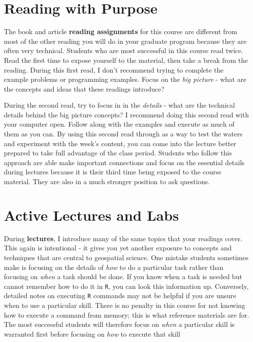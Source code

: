 \documentclass[]{book}
\theoremstyle{definition}
\theoremstyle{definition}
\theoremstyle{remark}
\begin{document}
\section{Reading with Purpose}\label{reading-with-purpose}

The book and article \textbf{reading assignments} for this course are
different from most of the other reading you will do in your graduate
program because they are often very technical. Students who are most
successful in this course read twice. Read the first time to expose
yourself to the material, then take a break from the reading. During
this first read, I don't recommend trying to complete the example
problems or programming examples. Focus on the \emph{big picture} - what
are the concepts and ideas that these readings introduce?

During the second read, try to focus in in the \emph{details} - what are
the technical details behind the big picture concepts? I recommend doing
this second read with your computer open. Follow along with the examples
and execute as much of them as you can. By using this second read
through as a way to test the waters and experiment with the week's
content, you can come into the lecture better prepared to take full
advantage of the class period. Students who follow this approach are
able make important connections and focus on the essential details
during lectures because it is their third time being exposed to the
course material. They are also in a much stronger position to ask
questions.

\section{Active Lectures and Labs}\label{active-lectures-and-labs}

During \textbf{lectures}, I introduce many of the same topics that your
readings cover. This again is intentional - it gives you yet another
exposure to concepts and techniques that are central to geospatial
science. One mistake students sometimes make is focusing on the details
of \emph{how} to do a particular task rather than focusing on
\emph{when} a task should be done. If you know when a task is needed but
cannot remember how to do it in \texttt{R}, you can look this
information up. Conversely, detailed notes on executing \texttt{R}
commands may not be helpful if you are unsure when to use a particular
skill. There is no penalty in this course for not knowing how to execute
a command from memory; this is what reference materials are for. The
most successful students will therefore focus on \emph{when} a
particular skill is warranted first before focusing on \emph{how} to
execute that skill
\end{document}
